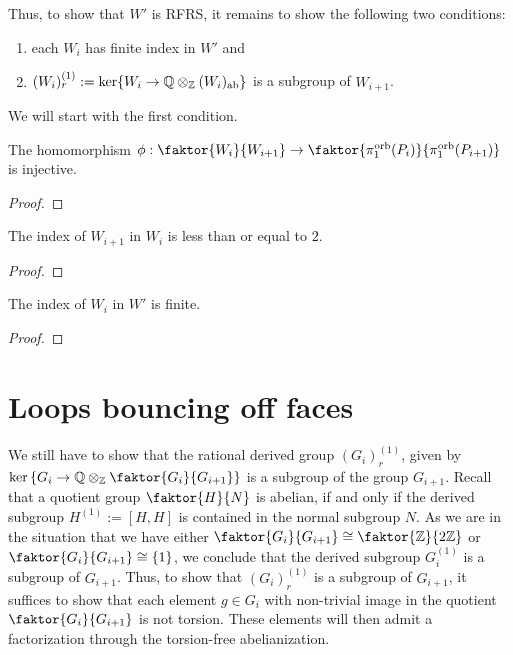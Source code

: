 \noindent
Thus, to show that \(W'\) is RFRS, it remains to show the following two conditions:
\begin{enumerate}
    \item each \(W_i\) has finite index in \(W'\) and
    \item \((W_i)_r^{(1)} := \ker\{W_i \to \mathbb{Q} \otimes_{\mathbb{Z}} (W_i)_{\text{ab}}\}\) is a subgroup of \(W_{i+1}\).
\end{enumerate}
We will start with the first condition.

\begin{lemma}
    The homomorphism \(\phi : \faktor{W_i}{W_{i+1}} \to \faktor{\pi_1^{\text{orb}}(P_i)}{\pi_1^{\text{orb}}(P_{i+1})}\) is injective.
\end{lemma}
\begin{proof}    
\end{proof}

\begin{corollary}
    The index of \(W_{i+1}\) in \(W_i\) is less than or equal to \(2\).
\end{corollary}
\begin{proof}
\end{proof}

\begin{corollary}
    The index of \(W_i\) in \(W'\) is finite.
\end{corollary}
\begin{proof}
\end{proof}


\section{Loops bouncing off faces}

We still have to show that the rational derived group \((G_i)_r^{(1)}\), given by \(\ker\left\{G_i \to \Q \otimes_\Z \faktor{G_i}{G_{i+1}}\right\}\) is a subgroup of the group \(G_{i+1}\).
Recall that a quotient group \(\faktor{H}{N}\) is abelian, if and only if the derived subgroup \(H^{(1)} := [H, H]\) is contained in the normal subgroup \(N\).
As we are in the situation that we have either \(\faktor{G_i}{G_{i+1}} \cong \faktor{\Z}{2\Z}\) or \(\faktor{G_i}{G_{i+1}} \cong \{1\}\), we conclude that the derived subgroup \(G_i^{(1)}\) is a subgroup of \(G_{i+1}\). %
Thus, to show that \((G_i)_r^{(1)}\) is a subgroup of \(G_{i+1}\), it suffices to show that each element \(g \in G_i\) with non-trivial image in the quotient \(\faktor{G_i}{G_{i+1}}\) is not torsion.
These elements will then admit a factorization through the torsion-free abelianization. 
\begin{figure}[h!]
    \centering
\end{figure}

